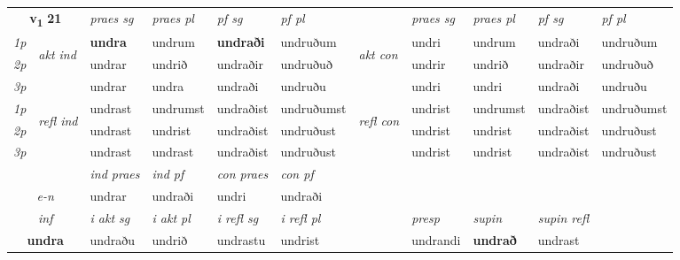 \noindent
\begin{tabular}{lllllllllll} \toprule
\multicolumn{2}{c}{\textbf{v{\textsubscript{1}}} \Large{\textbf{21}}}  &  \textit{praes sg}  & \textit{praes pl}  &\textit{ pf sg} & \textit{pf pl} &  &  \textit{praes sg}  & \textit{praes pl}  & \textit{pf sg} & \textit{pf pl } \\*
	\cmidrule{3-6} \cmidrule{8-11}
 {\textit{1p}} & \multirow{3}{*}{\begin{turn}{90}\textit{akt ind}\end{turn}} & \textbf{undra} & undrum & \textbf{undraði} & undruðum & \multirow{3}{*}{\begin{turn}{90}\textit{akt con}\end{turn}} &undri & undrum & undraði & undruðum\\*
 {\textit{2p}} &  &  undrar  & undrið & undraðir & undruðuð & & undrir & undrið & undraðir & undruðuð \\*
{\textit{3p}} &  & undrar & undra & undraði & undruðu & & undri & undri& undraði & undruðu \\*
\cmidrule{3-6} \cmidrule{8-11}
 {\textit{1p}} & \multirow{3}{*}{\begin{turn}{90}\textit{refl ind}\end{turn}}  & undrast & undrumst & undraðist & undruðumst & \multirow{3}{*}{\begin{turn}{90}\textit{refl con}\end{turn}}  &undrist & undrumst & undraðist & undruðumst \\*
 {\textit{2p}} &  & undrast & undrist & undraðist & undruðust & &undrist & undrist & undraðist & undruðust \\*
 {\textit{3p}}  & & undrast & undrast & undraðist & undruðust & & undrist & undrist& undraðist & undruðust \\*
\cmidrule{3-6} \cmidrule{8-11}

   & &  \textit{ind praes} & \textit{ind pf} & \textit{con praes} & \textit{con pf} \\*
\multicolumn{2}{c}{ \textit{e-n} } & undrar & undraði & undri & undraði \\*

\cmidrule{3-10}
   \multicolumn{2}{c}{\textit{inf}}  & \textit{i akt sg} & \textit{i akt pl} & \textit{i refl sg} & \textit{i refl pl} && \textit{presp} & \textit{supin} & \textit{supin refl}  \\*
  \multicolumn{2}{c}{\textbf{undra}} & undraðu  & undrið & undrastu & undrist && undrandi &  \textbf{undrað} & undrast  \\*
\end{tabular}

